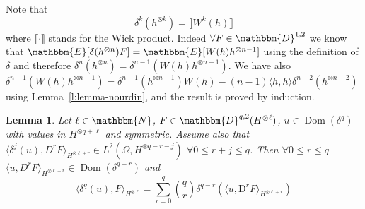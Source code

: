 \documentclass[a4paper,11pt]{article}
\newcommand{\cdummy}{\cdot}
\newcommand{\mathD}{\mathrm{D}}
\newcommand{\tmop}[1]{\ensuremath{\operatorname{#1}}}
\newtheorem{lemma}[theorem]{Lemma}
{\theorembodyfont{\rmfamily}\newtheorem{remark}[theorem]{Remark}}
\begin{document}
\begin{remark}
  \label{r:delta-tensor}Note that
  \[ \delta^k (h^{\otimes k}) = \llbracket W^k (h) \rrbracket \]
  where $\llbracket \cdummy \rrbracket$ stands for the Wick product. Indeed
  $\forall F \in \mathbbm{D}^{1, 2}$ we know that $\mathbbm{E} [\delta
  (h^{\otimes n}) F] =\mathbbm{E} [W (h) h^{\otimes n - 1}]$ using the
  definition of $\delta$ and therefore $\delta^n (h^{\otimes n}) = \delta^{n -
  1} (W (h) h^{\otimes n - 1})$. We have also $\delta^{n - 1} (W (h)
  h^{\otimes n - 1}) = \delta^{n - 1} (h^{\otimes n - 1}) W (h) - (n - 1)
  \langle h, h \rangle \delta^{n - 2} (h^{\otimes n - 2})$ using
  Lemma~\ref{l:lemma-nourdin}, and the result is proved by induction. 
\end{remark}

\begin{lemma}
  \label{l:lemma-nourdin2}Let $\ell \in \mathbbm{N}$, $F \in \mathbbm{D}^{q,
  2} (H^{\otimes \ell})$, $u \in \tmop{Dom} (\delta^q)$ with values in
  $H^{\otimes q + \ell}$ and symmetric. Assume also that $\langle \delta^j
  (u), D^r F \rangle_{H^{\otimes \ell + r}} \in L^2 (\Omega, H^{\otimes q - r
  - j})$ $\forall 0 \leqslant r + j \leqslant q$. Then $\forall 0 \leqslant r
  \leqslant q$ $\langle u, D^r F \rangle_{H^{\otimes \ell + r}} \in \tmop{Dom}
  (\delta^{q - r})$ and
  \[ \langle \delta^q (u), F \rangle_{H^{\otimes \ell}} = \sum_{r = 0}^q
     \binom{q}{r} \delta^{q - r} (\langle u, \mathD^r F \rangle_{H^{\otimes
     \ell + r}}) \]
\end{lemma}
\end{document}
